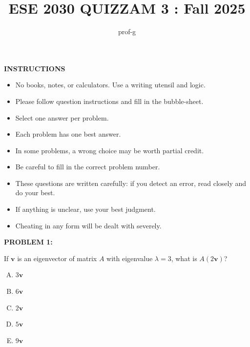 \documentclass[12pt]{amsart}
\title{ESE 2030 QUIZZAM 3 : Fall 2025}
\author{prof-g}
\begin{document}
\maketitle

\begin{center}
    {\bf INSTRUCTIONS}
\end{center}

\begin{itemize}
\item 
No books, notes, or calculators. Use a writing utensil and logic. 

\item 
Please follow question instructions and fill in the bubble-sheet. 

\item 
Select one answer per problem.

\item 
Each problem has one best answer. 

\item 
In some problems, a wrong choice may be worth partial credit. 

\item 
Be careful to fill in the correct problem number. 

\item 
These questions are written carefully: if you detect an error, read closely and do your best.

\item 
If anything is unclear, use your best judgment. 

\item 
Cheating in any form will be dealt with severely. 
\end{itemize}

\newpage





{\bf PROBLEM 1:}

If $\mathbf{v}$ is an eigenvector of matrix $A$ with eigenvalue $\lambda = 3$, what is $A(2\mathbf{v})$?

\begin{enumerate}[(A)]
\item $3\mathbf{v}$
\item $6\mathbf{v}$
\item $2\mathbf{v}$
\item $5\mathbf{v}$
\item $9\mathbf{v}$
\end{enumerate}
\end{document}
